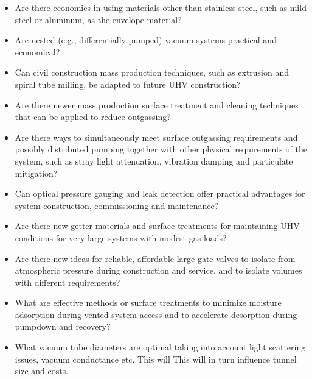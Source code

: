 \begin{itemize}
\item  Are there economies in using materials other than stainless steel, such as mild steel or aluminum, as the envelope material? %
\item Are nested (e.g., differentially pumped) vacuum systems practical and economical? 

\item Can civil construction mass production techniques, such as extrusion and spiral tube milling, be adapted to future UHV construction?

\item Are there newer mass production surface treatment and cleaning techniques that can be applied to reduce outgassing? %

\item Are there ways to simultaneously meet surface outgassing requirements and possibly distributed pumping together with other physical requirements of the system, such as 
stray light attenuation, vibration damping and particulate mitigation?

\item Can optical pressure gauging and leak detection offer practical advantages for system construction, commissioning and maintenance?

\item Are there new getter materials and surface treatments for maintaining UHV conditions for very large systems with modest gas loads?

\item Are there new ideas for reliable, affordable large gate valves to isolate from atmospheric pressure during construction and service, and to isolate volumes with different requirements?

\item What are effective methods or surface treatments to minimize moisture adsorption during vented system access and to accelerate desorption during pumpdown and recovery?

\item What vacuum tube diameters are optimal taking into account light scattering issues, vacuum conductance etc. This will This will in turn influence tunnel size and costs.

\end{itemize}

